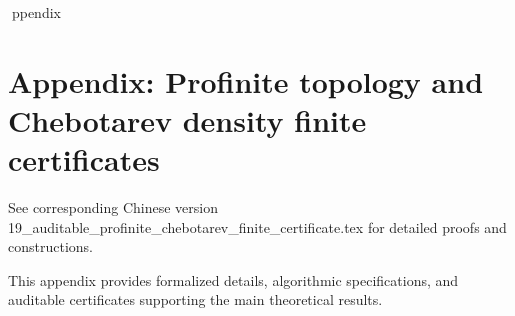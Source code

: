 ppendix

\section*{Appendix: Profinite topology and Chebotarev density finite certificates}

See corresponding Chinese version 19_auditable_profinite_chebotarev_finite_certificate.tex for detailed proofs and constructions.

This appendix provides formalized details, algorithmic specifications, and auditable certificates supporting the main theoretical results.
